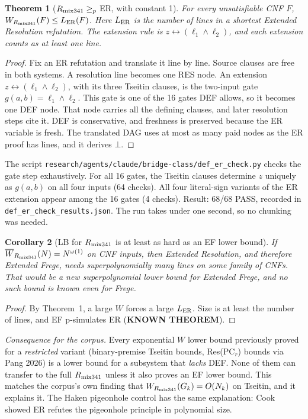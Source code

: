 \documentclass[11pt]{article}
\newtheorem{theorem}{Theorem}
\newtheorem{corollary}[theorem]{Corollary}
\begin{document}
\begin{theorem}[$R_{\rm mix341}\ge_p$ ER, with constant 1]
For every unsatisfiable CNF $F$, $W_{R_{\rm mix341}}(F)\le L_{\rm ER}(F)$. Here $L_{\rm ER}$ is the number of lines in a shortest Extended Resolution refutation. The extension rule is $z\leftrightarrow(\ell_1\wedge\ell_2)$, and each extension counts as at least one line.
\end{theorem}
\begin{proof}
Fix an ER refutation and translate it line by line. Source clauses are free in both systems. A resolution line becomes one RES node. An extension $z\leftrightarrow(\ell_1\wedge\ell_2)$, with its three Tseitin clauses, is the two-input gate $g(a,b)=\ell_1\wedge\ell_2$. This gate is one of the 16 gates DEF allows, so it becomes one DEF node. That node carries all the defining clauses, and later resolution steps cite it. DEF is conservative, and freshness is preserved because the ER variable is fresh. The translated DAG uses at most as many paid nodes as the ER proof has lines, and it derives $\bot$.
\end{proof}
The script \texttt{research/agents/claude/bridge-class/def\_er\_check.py} checks the gate step exhaustively. For all 16 gates, the Tseitin clauses determine $z$ uniquely as $g(a,b)$ on all four inputs (64 checks). All four literal-sign variants of the ER extension appear among the 16 gates (4 checks). Result: 68/68 PASS, recorded in \texttt{def\_er\_check\_results.json}. The run takes under one second, so no chunking was needed.

\begin{corollary}[LB for $R_{\rm mix341}$ is at least as hard as an EF lower bound]
If $\overline W_{R_{\rm mix341}}(N)=N^{\omega(1)}$ on CNF inputs, then Extended Resolution, and therefore Extended Frege, needs superpolynomially many lines on some family of CNFs. That would be a new superpolynomial lower bound for Extended Frege, and no such bound is known even for Frege.
\end{corollary}
\begin{proof}
By Theorem~1, a large $W$ forces a large $L_{\rm ER}$. Size is at least the number of lines, and EF p-simulates ER (\textbf{KNOWN THEOREM}).
\end{proof}
\noindent\emph{Consequence for the corpus.} Every exponential $W$ lower bound previously proved for a \emph{restricted} variant (binary-premise Tseitin bounds, Res(PC$_r$) bounds via Pang 2026) is a lower bound for a subsystem that \emph{lacks} DEF. None of them can transfer to the full $R_{\rm mix341}$ unless it also proves an EF lower bound. This matches the corpus's own finding that $W_{R_{\rm mix341}}(G_k)=O(N_k)$ on Tseitin, and it explains it. The Haken pigeonhole control has the same explanation: Cook showed ER refutes the pigeonhole principle in polynomial size.
\end{document}
